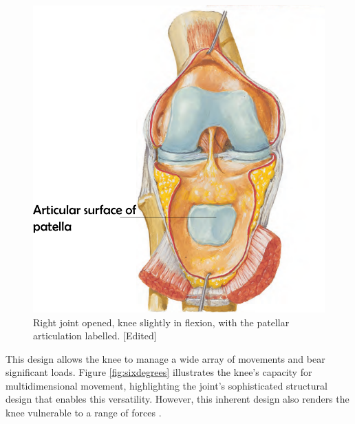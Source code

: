 \documentclass{micro-econ-thesis}
\begin{document}
\begin{figure} [H]
	\centering
	\includegraphics[scale=0.3]{patellar_surface}
	\caption[patellar surface]{Right joint opened, knee slightly in flexion, with the patellar articulation labelled. [Edited] \parencite[p.517]{netter_519_2023}}
	\label{fig:patellarsurface}
\end{figure}

This design allows the knee to manage a wide array of movements and bear significant loads. Figure \ref{fig:sixdegrees} illustrates the knee's capacity for multidimensional movement, highlighting the joint's sophisticated structural design that enables this versatility. However, this inherent design also renders the knee vulnerable to a range of forces \parencite{standring_grays_2021}.
\end{document}
